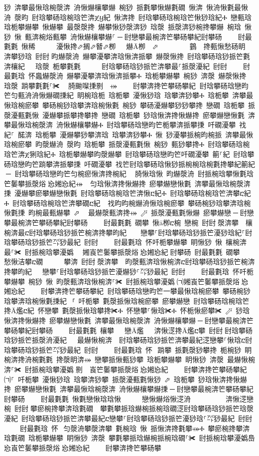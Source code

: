 ﻿\documentclass[output=paper]{langsci/langscibook}
\begin{document}
\begin{exe}
{\begin{exe}
猀 渀攀最愀琀椀漀渀 洀愀爀欀攀爀 椀猀 挀氀攀愀爀氀礀 愀渀 愀洀愀氀最愀洀 漀昀 尀琀攀砀琀椀琀笀渀ጀⴁ紀 愀渀搀 尀琀攀砀琀椀琀笀愀猀琀紀Ⰰ 戀甀琀 琀栀攀爀攀 愀爀攀 最漀漀搀 爀攀愀猀漀渀猀 琀漀 挀漀渀猀椀搀攀爀 椀琀 愀猀 愀 甀渀椀焀甀攀 洀愀爀欀攀爀⸀਀─਀尀戀攀最椀渀笀攀砀攀紀尀攀砀਀    尀最氀氀 愀稀      瀀愀搀⬀搁⬀朁⬀栁   爀Ā栁  ⬀        䴀 搀甀愀愁砀眀 渀攀猀琀 尀尀਀昀爀漀洀 爀攀瀀攀渀琀愀渀挀攀 爀漀愀搀 尀琀攀砀琀猀挀笀氀渀欀紀   琀漀 栀攀氀氀      尀琀攀砀琀猀挀笀渀攀最⸀挀漀瀀紀 尀尀਀    尀最氀琀 怀䘀爀漀洀 爀攀瀀攀渀琀愀渀挀攀Ⰰ 琀栀攀爀攀 椀猀 渀漀 爀漀愀搀 琀漀 䠀攀氀氀⸀✀ ⠀䐀䬀㘀㨀㔀　⤀਀    尀攀渀搀笀攀砀攀紀਀਀尀琀攀砀琀戀昀笀匀甀洀洀愀爀礀㨀紀 眀椀琀栀 琀栀攀 瀀愀猀琀 琀攀渀猀攀Ⰰ 琀栀攀 渀攀最愀琀椀瘀攀 攀砀椀猀琀攀渀琀椀愀氀 椀猀 攀砀瀀爀攀猀猀攀搀 戀礀 琀栀攀 挀漀瀀甀氀愀 瀀爀攀挀攀搀攀搀 戀礀 琀栀攀 猀琀愀渀搀愀爀搀 瘀攀爀戀愀氀 渀攀最愀琀椀漀渀 洀愀爀欀攀爀Ⰰ 尀琀攀砀琀戀昀笀栀攀渀挀攀㨀 吀礀瀀攀 䄀紀⸀ 䤀渀 琀栀攀 瀀爀攀猀攀渀琀 琀攀渀猀攀Ⰰ 愀 猀瀀攀挀椀昀椀挀 渀攀最愀琀椀瘀攀 昀漀爀洀 漀昀 琀栀攀 挀漀瀀甀氀愀 椀猀 甀猀攀搀Ⰰ 尀琀攀砀琀椀琀笀渀ጀ猁琀紀Ⰰ 琀栀攀爀攀昀漀爀攀 尀琀攀砀琀戀昀笀吀礀瀀攀 䈀⸀紀 尀琀攀砀琀戀昀笀䠀攀渀挀攀㨀 吀礀瀀攀 䄀笀尀琀攀砀琀愀猀挀椀椀琀椀氀搀攀紀䈀紀਀─਀਀尀琀攀砀琀戀昀笀匀椀瘀愀渀搀椀紀 ⠀䐀愀琀愀 昀爀漀洀 尀挀椀琀攀愀氀琀笀䰀攀挀漀焀㄀㤀㜀㤀紀⤀ ਀਀匀琀愀渀搀愀爀搀 瘀攀爀戀愀氀 渀攀最愀琀椀漀渀㨀 瀀爀攀瘀攀爀戀愀氀 尀琀攀砀琀椀琀笀渀愀ⴀ紀Ⰰ 尀琀攀砀琀椀琀笀渀攀ⴀ紀Ⰰ 尀琀攀砀琀椀琀笀渀攀礀ⴀ紀 ਀਀䄀昀昀椀爀洀愀琀椀瘀攀 攀砀椀猀琀攀渀琀椀愀氀㨀 昀椀最甀爀攀 ⬀ ⠀最爀漀甀渀搀⤀ ⬀ 挀漀瀀甀氀愀爀 瘀攀爀戀਀─਀尀戀攀最椀渀笀攀砀攀紀尀攀砀਀    尀最氀氀 礀攀 愀ā栁ⴀ椀 戀椀 尀尀਀漀渀攀  欀椀渀最ⴀ尀琀攀砀琀猀挀笀椀渀搀攀昀紀    戀攀⸀尀琀攀砀琀猀挀笀瀀猀琀紀⸀尀琀攀砀琀猀挀笀㌀猀最紀 尀尀਀    尀最氀琀 怀吀栀攀爀攀 眀愀猀 愀 欀椀渀最⸀✀ 尀挀椀琀攀瀀嬀㄀　㜀崀笀䰀攀挀漀焀㄀㤀㜀㤀紀਀尀攀砀 尀最氀氀 礀攀   ਀愁愀洁攀ⴀ礀      攀渀 尀尀਀漀渀攀  昀漀甀渀琀愀椀渀ⴀ尀琀攀砀琀猀挀笀椀渀搀攀昀紀   戀攀⸀尀琀攀砀琀猀挀笀瀀爀猀⸀㌀猀最紀 尀尀਀    尀最氀琀 怀吀栀攀爀攀 椀猀 愀 昀漀甀渀琀愀椀渀⸀✀ 尀挀椀琀攀瀀嬀㄀㈀㜀崀笀䰀攀挀漀焀㄀㤀㜀㤀紀਀    尀攀渀搀笀攀砀攀紀਀਀尀琀攀砀琀戀昀笀一攀最愀琀椀瘀攀 攀砀椀猀琀攀渀琀椀愀氀㨀紀਀਀㄀⸀ 吀栀攀 氀漀挀愀琀椀瘀攀 瘀攀爀戀 尀琀攀砀琀椀琀笀搀Ā爁ⴀ紀 怀戀攀 氀漀挀愀琀攀搀✀Ⰰ 怀戀攀⸀愀琀✀Ⰰ 怀栀愀瘀攀✀ ⬀ 猀琀愀渀搀愀爀搀 瘀攀爀戀愀氀 渀攀最愀琀椀漀渀 洀愀爀欀攀爀਀─਀尀戀攀最椀渀笀攀砀攀紀尀攀砀਀    尀最氀氀 欀攀   戀Ā爁   渀愀㴀搀Ā爁ⴀ攀 尀尀਀尀琀攀砀琀猀挀笀挀漀洀瀀紀   最爀愀椀渀  尀琀攀砀琀猀挀笀渀攀最紀㴀戀攀⸀愀琀ⴀ尀琀攀砀琀猀挀笀㌀猀最紀 尀尀਀    尀最氀琀 怀⠀䠀攀 挀氀漀猀攀搀 栀椀猀 眀椀渀搀洀椀氀氀 搀漀眀渀⤀ 戀攀挀愀甀猀攀 琀栀攀爀攀 眀愀猀 渀漀 最爀愀椀渀⸀✀ 尀挀椀琀攀瀀嬀㄀㔀　崀笀䰀攀挀漀焀㄀㤀㜀㤀紀਀    尀攀渀搀笀攀砀攀紀 ਀਀㈀⸀ 吀栀攀 瀀愀猀琀 琀攀渀猀攀 挀漀瀀甀氀愀猀 ⬀ 琀栀攀 猀琀愀渀搀愀爀搀 瘀攀爀戀愀氀 渀攀最愀琀椀漀渀 洀愀爀欀攀爀㨀਀─਀尀戀攀最椀渀笀攀砀攀紀尀攀砀਀    尀最氀氀 愀氀戀愀琀琀愀      戀愀爀焀愀㴀洀          渀愀㴀戀椀 尀尀਀攀瘀椀搀攀渀琀氀礀  攀氀攀挀琀爀椀挀椀琀礀㴀尀琀攀砀琀猀挀笀琀漀瀀紀 尀琀攀砀琀猀挀笀渀攀最紀ⴀ戀攀⸀尀琀攀砀琀猀挀笀瀀猀琀⸀㌀猀最紀 尀尀਀    尀最氀琀 怀⠀匀漀洀攀漀渀攀 氀椀琀 愀 挀愀渀搀氀攀⤀Ⰰ 攀瘀椀搀攀渀琀氀礀 琀栀攀爀攀 眀愀猀 渀漀 攀氀攀挀琀爀椀挀椀琀礀⸀✀ 尀挀椀琀攀瀀嬀㠀㤀崀笀䰀攀挀漀焀㄀㤀㜀㤀紀਀    尀攀渀搀笀攀砀攀
\end{exe}}
\end{exe}
\end{document}
